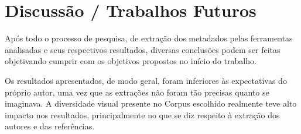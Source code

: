
\chapter{Discussão / Trabalhos Futuros} %
\label{cha:conclusion}






Após todo o processo de pesquisa, de extração dos metadados pelas ferramentas analisadas e seus respectivos resultados, diversas conclusões podem ser feitas objetivando cumprir com os objetivos propostos no início do trabalho.

Os resultados apresentados, de modo geral, foram inferiores às expectativas do próprio autor, uma vez que as extrações não foram tão precisas quanto se imaginava. A diversidade visual presente no Corpus escolhido realmente teve alto impacto nos resultados, principalmente no que se diz respeito à extração dos autores e das referências.



